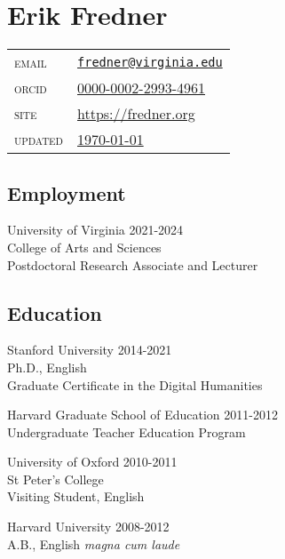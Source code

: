 \documentclass[
  12pt,
  letterpaper,
]{article}
\author{}
\date{}
\begin{document}
\hypertarget{erik-fredner}{%
\section{Erik Fredner}\label{erik-fredner}}

\begin{longtable}[]{@{}ll@{}}
\endhead
\endlastfoot
\textsc{email} &
\href{mailto:fredner@virginia.edu}{\nolinkurl{fredner@virginia.edu}} \\
\textsc{orcid} &
\href{https://orcid.org/0000-0002-2993-4961}{0000-0002-2993-4961} \\
\textsc{site} & \href{https://fredner.org}{https://fredner.org}\\
\textsc{updated} & \href{https://github.com/erikfredner/cv}{\today} \\
\end{longtable}

\hypertarget{employment}{%
\subsection{Employment}\label{employment}}


University of Virginia \hfill 2021-2024\\
College of Arts and Sciences\\
Postdoctoral Research Associate and Lecturer

\hypertarget{education}{%
\subsection{Education}\label{education}}

Stanford University \hfill 2014-2021\\
Ph.D., English\\
Graduate Certificate in the Digital Humanities

Harvard Graduate School of Education \hfill 2011-2012\\
Undergraduate Teacher Education Program

University of Oxford \hfill 2010-2011\\
St Peter's College\\
Visiting Student, English

Harvard University \hfill 2008-2012\\
A.B., English \emph{magna cum laude}
\end{document}
